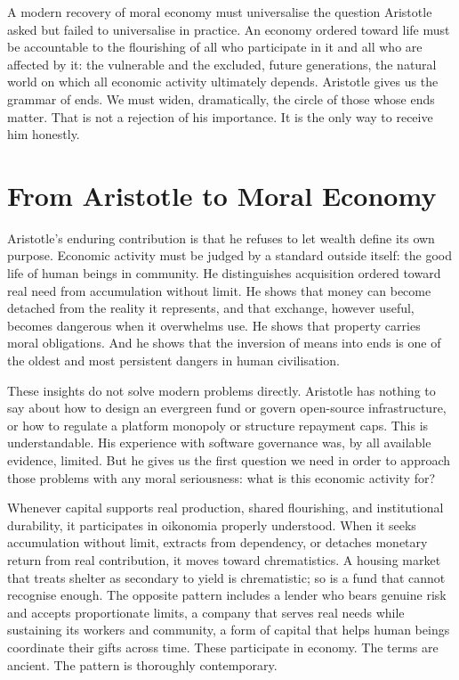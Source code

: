 \documentclass[11pt,a4paper,oneside]{book}
\begin{document}
A modern recovery of moral economy must universalise the question Aristotle asked but failed to universalise in practice. An economy ordered toward life must be accountable to the flourishing of all who participate in it and all who are affected by it: the vulnerable and the excluded, future generations, the natural world on which all economic activity ultimately depends. Aristotle gives us the grammar of ends. We must widen, dramatically, the circle of those whose ends matter. That is not a rejection of his importance. It is the only way to receive him honestly.

\section*{From Aristotle to Moral Economy}

Aristotle's enduring contribution is that he refuses to let wealth define its own purpose. Economic activity must be judged by a standard outside itself: the good life of human beings in community. He distinguishes acquisition ordered toward real need from accumulation without limit. He shows that money can become detached from the reality it represents, and that exchange, however useful, becomes dangerous when it overwhelms use. He shows that property carries moral obligations. And he shows that the inversion of means into ends is one of the oldest and most persistent dangers in human civilisation.

These insights do not solve modern problems directly. Aristotle has nothing to say about how to design an evergreen fund or govern open-source infrastructure, or how to regulate a platform monopoly or structure repayment caps. This is understandable. His experience with software governance was, by all available evidence, limited. But he gives us the first question we need in order to approach those problems with any moral seriousness: what is this economic activity for?

Whenever capital supports real production, shared flourishing, and institutional durability, it participates in oikonomia properly understood. When it seeks accumulation without limit, extracts from dependency, or detaches monetary return from real contribution, it moves toward chrematistics. A housing market that treats shelter as secondary to yield is chrematistic; so is a fund that cannot recognise enough. The opposite pattern includes a lender who bears genuine risk and accepts proportionate limits, a company that serves real needs while sustaining its workers and community, a form of capital that helps human beings coordinate their gifts across time. These participate in economy. The terms are ancient. The pattern is thoroughly contemporary.
\end{document}
